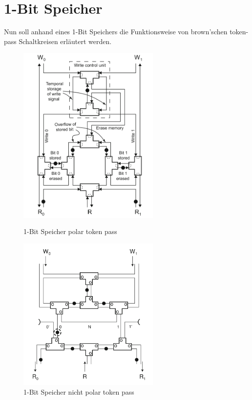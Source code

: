 \section{1-Bit Speicher}
Nun soll anhand eines 1-Bit Speichers die Funktionsweise von brown'schen 
token-pass Schaltkreisen erläutert werden. 

\begin{figure}
  \centering
  \begin{minipage}{0.45\textwidth}
      \centering
      \includegraphics[width=7cm]{bilder/PolarMemory.png} 
      \caption{1-Bit Speicher polar token pass}
  \end{minipage}\hfill
  \begin{minipage}{0.45\textwidth}
      \centering
      \includegraphics[width=7cm]{bilder/NonPolarMemory.png} 
      \caption{1-Bit Speicher nicht polar token pass}
  \end{minipage}
\end{figure}

